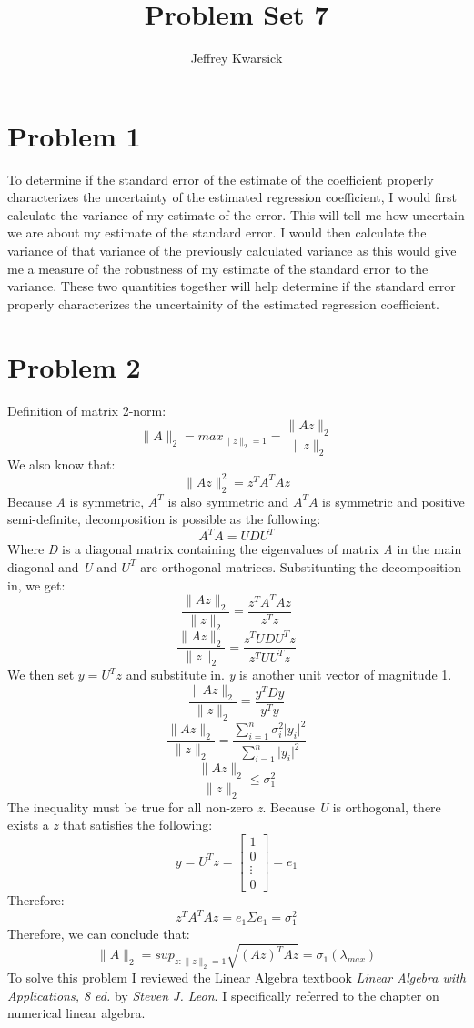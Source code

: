 \documentclass{article}\usepackage[]{graphicx}\usepackage[]{color}
\begin{document}
\title{Problem Set 7}
\author{Jeffrey Kwarsick}
\maketitle

\def\B{
\begin{bmatrix}
    1 \\
    0\\
    \vdots \\
    0
\end{bmatrix}}

\section{Problem 1}
To determine if the standard error of the estimate of the coefficient properly characterizes the uncertainty of the estimated regression coefficient, I would first calculate the variance of my estimate of the error.  This will tell me how uncertain we are about my estimate of the standard error.  I would then calculate the variance of that variance of the previously calculated variance as this would give me a measure of the robustness of my estimate of the standard error to the variance.  These two quantities together will help determine if the standard error properly characterizes the uncertainity of the estimated regression coefficient.
\section{Problem 2}
Definition of matrix 2-norm:
\[ \|A\|_2 = max_{\|z\|_2 = 1} = \frac{\|Az\|_2}{\|z\|_2} \]
We also know that:
\[ \|Az\|_2^2 = z^T A^T A z \]
Because \emph{A} is symmetric, $A^T$ is also symmetric and $A^T A$ is symmetric and positive semi-definite, decomposition is possible as the following:
\[A^T A = U D U^T \]
Where \emph{D} is a diagonal matrix containing the eigenvalues of matrix \emph{A} in the main diagonal and \emph{U} and $U^T$ are orthogonal matrices.  Substitunting the decomposition in, we get:
\[\frac{\|Az\|_2}{\|z\|_2} = \frac{z^T A^T A z}{z^T z} \]
\[\frac{\|Az\|_2}{\|z\|_2} = \frac{z^T U D U^T z}{z^T U U^T z} \]
We then set $ y = U^T z$ and substitute in.  \emph{y} is another unit vector of magnitude 1.
\[ \frac{\|Az\|_2}{\|z\|_2} = \frac{y^T D y}{y^T y} \]
\[ \frac{\|Az\|_2}{\|z\|_2} = \frac{\sum_{i=1}^n \sigma_i^2 \vert y_i \vert ^2}{\sum_{i=1}^n \vert y_i \vert ^2} \]
\[ \frac{\|Az\|_2}{\|z\|_2} \leq \sigma_1^2 \]
The inequality must be true for all non-zero \emph{z}. Because \emph{U} is orthogonal, there exists a \emph{z} that satisfies the following:
\[ y = U^T z = \B = e_1\]
Therefore:
\[ z^T A^T A z = e_1 \Sigma e_1 = \sigma_1^2\]
Therefore, we can conclude that:
\[ \|A\|_2 = sup_{z:\|z\|_2=1}\sqrt{(Az)^T Az}  = \sigma_1 (\lambda_{max}) \]
To solve this problem I reviewed the Linear Algebra textbook \emph{Linear Algebra with Applications, 8 ed.} by \emph{Steven J. Leon}.  I specifically referred to the chapter on numerical linear algebra.
\end{document}
